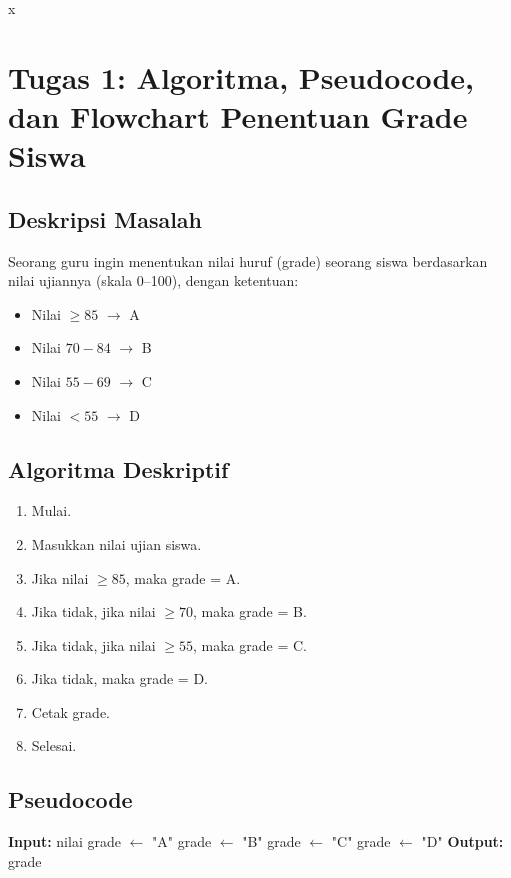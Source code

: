 x\documentclass[a4paper,11pt]{article}
\begin{document}
\section*{Tugas 1: Algoritma, Pseudocode, dan Flowchart Penentuan Grade Siswa}

\subsection*{Deskripsi Masalah}
Seorang guru ingin menentukan nilai huruf (grade) seorang siswa berdasarkan nilai ujiannya (skala 0--100), dengan ketentuan:
\begin{itemize}
    \item Nilai $\geq 85$ $\rightarrow$ A
    \item Nilai $70-84$ $\rightarrow$ B
    \item Nilai $55-69$ $\rightarrow$ C
    \item Nilai $< 55$ $\rightarrow$ D
\end{itemize}

\subsection*{Algoritma Deskriptif}
\begin{enumerate}
    \item Mulai.
    \item Masukkan nilai ujian siswa.
    \item Jika nilai $\geq 85$, maka grade = A.
    \item Jika tidak, jika nilai $\geq 70$, maka grade = B.
    \item Jika tidak, jika nilai $\geq 55$, maka grade = C.
    \item Jika tidak, maka grade = D.
    \item Cetak grade.
    \item Selesai.
\end{enumerate}

\subsection*{Pseudocode}
\begin{algorithm}[h]
\caption{Penentuan Grade Siswa}
\begin{algorithmic}[1]
\State \textbf{Input:} nilai
    \State grade $\gets$ "A"
    \State grade $\gets$ "B"
    \State grade $\gets$ "C"
\Else
    \State grade $\gets$ "D"
\EndIf
\State \textbf{Output:} grade
\end{algorithmic}
\end{algorithm}
\end{document}
